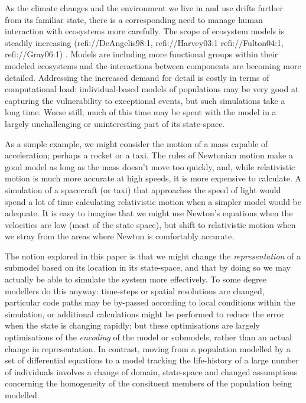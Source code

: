 \documentclass{article}
\newcommand{\tmem}[1]{{\em #1\/}}
\begin{document}
As the climate changes and the environment we live in and use drifts further
from its familiar state, there is a corresponding need to manage human
interaction with ecosystems more carefully. The scope of ecosystem models is
steadily increasing (refi://DeAngelis98:1, refi://Harvey03:1
refi://Fulton04:1, refi://Gray06:1){\color{red} }. Models are including more
functional groups within their modeled ecosystems and the interactions between
components are becoming more detailed. Addressing the increased demand for
detail is costly in terms of computational load: individual-based models of
populations may be very good at capturing the vulnerability to exceptional
events, but such simulations take a long time. Worse still, much of this time
may be spent with the model in a largely unchallenging or uninteresting part
of its state-space.

As a simple example, we might consider the motion of a mass capable of
acceleration; perhaps a rocket or a taxi. The rules of Newtonian motion make a
good model as long as the mass doesn't move too quickly, and, while
relativistic motion is much more accurate at high speeds, it is more expensive
to calculate. A simulation of a spacecraft (or taxi) that approaches the speed
of light would spend a lot of time calculating relativistic motion when a
simpler model would be adequate. It is easy to imagine that we might use
Newton's equations when the velocities are low (most of the state space), but
shift to relativistic motion when we stray from the areas where Newton is
comfortably accurate.

The notion explored in this paper is that we might change the
{\tmem{representation}} of a submodel based on its location in its
state-space, and that by doing so we may actually be able to simulate the
system more effectively. To some degree modellers do this anyway: time-steps
or spatial resolutions are changed, particular code paths may be by-passed
according to local conditions within the simulation, or additional
calculations might be performed to reduce the error when the state is changing
rapidly; but these optimisations are largely optimisations of the
{\tmem{encoding}} of the model or submodels, rather than an actual change in
representation. In contrast, moving from a population modelled by a set of
differential equations to a model tracking the life-history of a large number
of individuals involves a change of domain, state-space and changed
assumptions concerning the homogeneity of the consituent members of the
population being modelled.
\end{document}
